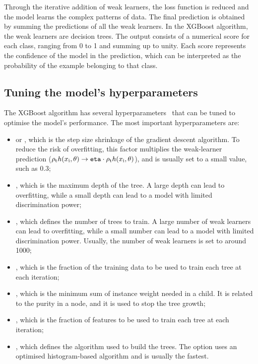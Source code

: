 Through the iterative addition of weak learners, the loss function is reduced and the model learns the complex patterns of data. The final prediction is obtained by summing the predictions of all the weak learners. In the XGBoost algorithm, the weak learners are decision trees. The output consists of a numerical score for each class, ranging from 0 to 1 and summing up to unity. Each score represents the confidence of the model in the prediction, which can be interpreted as the probability of the example belonging to that class.
\subsection{Tuning the model's hyperparameters}
The XGBoost algorithm has several hyperparameters~\cite{XGBoost_parameters} that can be tuned to optimise the model's performance. The most important hyperparameters are:
\begin{itemize}
    \item {} or , which is the step size shrinkage of the gradient descent algorithm. To reduce the risk of overfitting, this factor multiplies the weak-learner prediction ($\rho_\mathrm{t} h(x_\mathrm{i},\theta) \rightarrow \texttt{eta} \cdot \rho_\mathrm{t} h(x_\mathrm{i},\theta)$), and is usually set to a small value, such as 0.3;
    \item {}, which is the maximum depth of the tree. A large depth can lead to overfitting, while a small depth can lead to a model with limited discrimination power;
    \item {}, which defines the number of trees to train. A large number of weak learners can lead to overfitting, while a small number can lead to a model with limited discrimination power. Usually, the number of weak learners is set to around 1000;
    \item {}, which is the fraction of the training data to be used to train each tree at each iteration;
    \item {}, which is the minimum sum of instance weight needed in a child. It is related to the purity in a node, and it is used to stop the tree growth;
    \item {}, which is the fraction of features to be used to train each tree at each iteration;
    \item {}, which defines the algorithm used to build the trees. The  option uses an optimised histogram-based algorithm and is usually the fastest.
\end{itemize}

